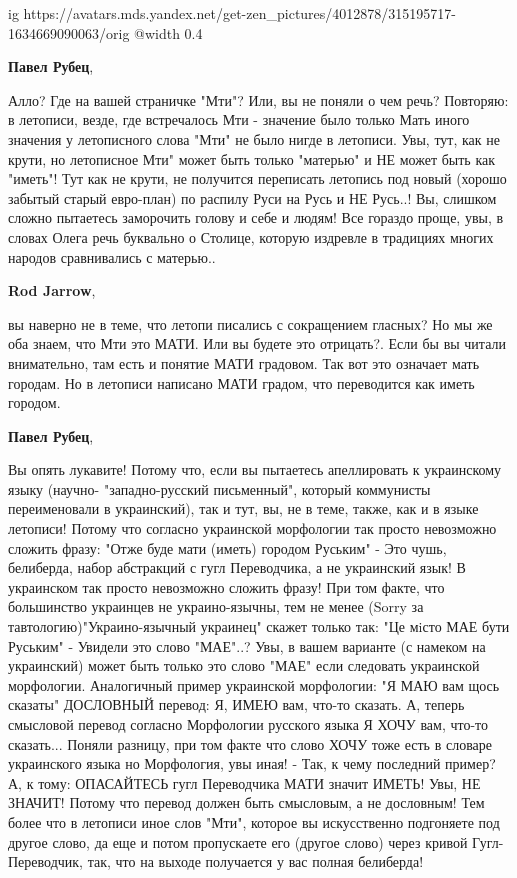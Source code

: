 \begin{itemize}
\begin{itemize}
\ifcmt
  ig https://avatars.mds.yandex.net/get-zen_pictures/4012878/315195717-1634669090063/orig
  @width 0.4
\fi

\textbf{Павел Рубец}, 

Алло? Где на вашей страничке "Мти"? Или, вы не поняли о чем речь? Повторяю: в
летописи, везде, где встречалось Мти - значение было только Мать иного значения
у летописного слова "Мти" не было нигде в летописи. Увы, тут, как не крути, но
летописное Мти" может быть только "матерью" и НЕ может быть как "иметь"! Тут
как не крути, не получится переписать летопись под новый (хорошо забытый старый
евро-план) по распилу Руси на Русь и НЕ Русь..! Вы, слишком сложно пытаетесь
заморочить голову и себе и людям! Все гораздо проще, увы, в словах Олега речь
буквально о Столице, которую издревле в традициях многих народов сравнивались с
матерью..

\textbf{Rod Jarrow}, 

вы наверно не в теме, что летопи писались с сокращением гласных? Но мы же оба
знаем, что Мти это МАТИ. Или вы будете это отрицать?. Если бы вы читали
внимательно, там есть и понятие МАТИ градовом. Так вот это означает мать
городам. Но в летописи написано МАТИ градом, что переводится как иметь городом.

\textbf{Павел Рубец}, 

Вы опять лукавите! Потому что, если вы пытаетесь апеллировать к украинскому
языку (научно- "западно-русский письменный", который коммунисты переименовали в
украинский), так и тут, вы, не в теме, также, как и в языке летописи! Потому
что согласно украинской морфологии так просто невозможно сложить фразу: "Отже
буде мати (иметь) городом Руським" - Это чушь, белиберда, набор абстракций с
гугл Переводчика, а не украинский язык! В украинском так просто невозможно
сложить фразу! При том факте, что большинство украинцев не украино-язычны, тем
не менее (Sorry за тавтологию)"Украино-язычный украинец" скажет только так: "Це
мiсто МАЕ бути Руським" - Увидели это слово "МАЕ"..? Увы, в вашем варианте (с
намеком на украинский) может быть только это слово "МАЕ" если следовать
украинской морфологии. Аналогичный пример украинской морфологии: "Я МАЮ вам
щось сказаты" ДОСЛОВНЫЙ перевод: Я, ИМЕЮ вам, что-то сказать. А, теперь
смысловой перевод согласно Морфологии русского языка Я ХОЧУ вам, что-то
сказать... Поняли разницу, при том факте что слово ХОЧУ тоже есть в словаре
украинского языка но Морфология, увы иная! - Так, к чему последний пример? А, к
тому: ОПАСАЙТЕСЬ гугл Переводчика МАТИ значит ИМЕТЬ! Увы, НЕ ЗНАЧИТ! Потому что
перевод должен быть смысловым, а не дословным! Тем более что в летописи иное
слов "Мти", которое вы искусственно подгоняете под другое слово, да еще и потом
пропускаете его (другое слово) через кривой Гугл-Переводчик, так, что на выходе
получается у вас полная белиберда!


\end{itemize}
\end{itemize}

